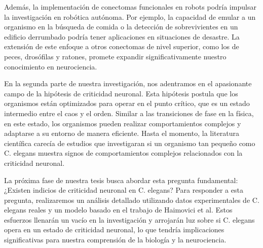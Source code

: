 Además, la implementación de conectomas funcionales en robots podría impulsar la investigación en robótica autónoma. Por ejemplo, la capacidad de emular a un organismo en la búsqueda de comida o la detección de sobrevivientes en un edificio derrumbado podría tener aplicaciones en situaciones de desastre. La extensión de este enfoque a otros conectomas de nivel superior, como los de peces, drosófilas y ratones, promete expandir significativamente nuestro conocimiento en neurociencia.

En la segunda parte de nuestra investigación, nos adentramos en el apasionante campo de la hipótesis de criticidad neuronal. Esta hipótesis postula que los organismos están optimizados para operar en el punto crítico, que es un estado intermedio entre el caos y el orden. Similar a las transiciones de fase en la física, en este estado, los organismos pueden realizar comportamientos complejos y adaptarse a su entorno de manera eficiente. Hasta el momento, la literatura científica carecía de estudios que investigaran si un organismo tan pequeño como C. elegans muestra signos de comportamientos complejos relacionados con la criticidad neuronal.

La próxima fase de nuestra tesis busca abordar esta pregunta fundamental: ¿Existen indicios de criticidad neuronal en C. elegans? Para responder a esta pregunta, realizaremos un análisis detallado utilizando datos experimentales de C. elegans reales y un modelo basado en el trabajo de Haimovici et al. Estos esfuerzos llenarán un vacío en la investigación y arrojarán luz sobre si C. elegans opera en un estado de criticidad neuronal, lo que tendría implicaciones significativas para nuestra comprensión de la biología y la neurociencia.






























